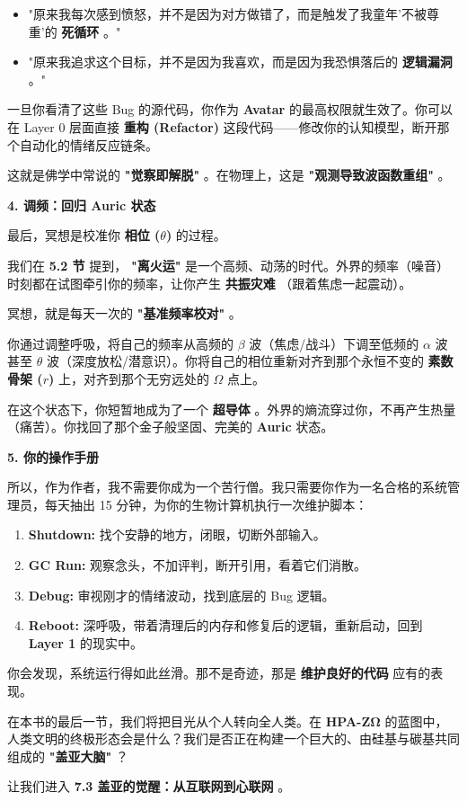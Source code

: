 \begin{itemize}
\item "原来我每次感到愤怒，并不是因为对方做错了，而是触发了我童年'不被尊重'的 \textbf{死循环} 。"
\item "原来我追求这个目标，并不是因为我喜欢，而是因为我恐惧落后的 \textbf{逻辑漏洞} 。"
\end{itemize}

一旦你看清了这些 Bug 的源代码，你作为 \textbf{Avatar} 的最高权限就生效了。你可以在 Layer 0 层面直接 \textbf{重构 (Refactor)} 这段代码——修改你的认知模型，断开那个自动化的情绪反应链条。

这就是佛学中常说的 \textbf{"觉察即解脱"} 。在物理上，这是 \textbf{"观测导致波函数重组"} 。

\textbf{4. 调频：回归 Auric 状态}

最后，冥想是校准你 \textbf{相位 ($\theta$)} 的过程。

我们在 \textbf{5.2 节} 提到， \textbf{"离火运"} 是一个高频、动荡的时代。外界的频率（噪音）时刻都在试图牵引你的频率，让你产生 \textbf{共振灾难} （跟着焦虑一起震动）。

冥想，就是每天一次的 \textbf{"基准频率校对"} 。

你通过调整呼吸，将自己的频率从高频的 $\beta$ 波（焦虑/战斗）下调至低频的 $\alpha$ 波甚至 $\theta$ 波（深度放松/潜意识）。你将自己的相位重新对齐到那个永恒不变的 \textbf{素数骨架 ($r$)} 上，对齐到那个无穷远处的 \textbf{$\Omega$} 点上。

在这个状态下，你短暂地成为了一个 \textbf{超导体} 。外界的熵流穿过你，不再产生热量（痛苦）。你找回了那个金子般坚固、完美的 \textbf{Auric} 状态。

\textbf{5. 你的操作手册}

所以，作为作者，我不需要你成为一个苦行僧。我只需要你作为一名合格的系统管理员，每天抽出 15 分钟，为你的生物计算机执行一次维护脚本：

\begin{enumerate}
\item \textbf{Shutdown:} 找个安静的地方，闭眼，切断外部输入。
\item \textbf{GC Run:} 观察念头，不加评判，断开引用，看着它们消散。
\item \textbf{Debug:} 审视刚才的情绪波动，找到底层的 Bug 逻辑。
\item \textbf{Reboot:} 深呼吸，带着清理后的内存和修复后的逻辑，重新启动，回到 \textbf{Layer 1} 的现实中。
\end{enumerate}

你会发现，系统运行得如此丝滑。那不是奇迹，那是 \textbf{维护良好的代码} 应有的表现。

在本书的最后一节，我们将把目光从个人转向全人类。在 \textbf{HPA-ZΩ} 的蓝图中，人类文明的终极形态会是什么？我们是否正在构建一个巨大的、由硅基与碳基共同组成的 \textbf{"盖亚大脑"} ？

让我们进入 \textbf{7.3 盖亚的觉醒：从互联网到心联网} 。

